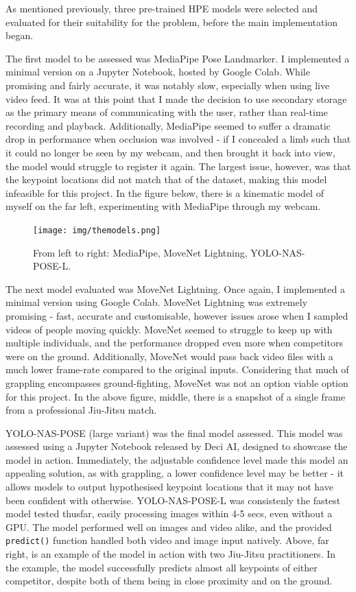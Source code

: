 \documentclass[a4paper, oneside, 11pt]{article}
\begin{document}
\noindent
As mentioned previously, three pre-trained HPE models were selected and evaluated for their suitability for the problem, before the main implementation began.

\bigskip
\noindent
The first model to be assessed was MediaPipe Pose Landmarker. I implemented a minimal version on a Jupyter Notebook, hosted by Google Colab. While promising and fairly accurate, it was notably slow, especially when using live video feed. It was at this point that I made the decision to use secondary storage as the primary means of communicating with the user, rather than real-time recording and playback. Additionally, MediaPipe seemed to suffer a dramatic drop in performance when occlusion was involved - if I concealed a limb such that it could no longer be seen by my webcam, and then brought it back into view, the model would struggle to register it again. The largest issue, however, was that the keypoint locations did not match that of the dataset, making this model infeasible for this project. In the figure below, there is a kinematic model of myself on the far left, experimenting with MediaPipe through my webcam.

\bigskip
\begin{figure}[ht]
    \centering
    \texttt{[image: img/themodels.png]}
    \caption{From left to right: MediaPipe, MoveNet Lightning, YOLO-NAS-POSE-L.}
    \label{fig:assessing-models}
\end{figure}

\bigskip
\noindent
The next model evaluated was MoveNet Lightning. Once again, I implemented a minimal version using Google Colab. MoveNet Lightning was extremely promising - fast, accurate and customisable, however issues arose when I sampled videos of people moving quickly. MoveNet seemed to struggle to keep up with multiple individuals, and the performance dropped even more when competitors were on the ground. Additionally, MoveNet would pass back video files with a much lower frame-rate compared to the original inputs. Considering that much of grappling encompasses ground-fighting, MoveNet was not an option viable option for this project. In the above figure, middle, there is a snapshot of a single frame from a professional Jiu-Jitsu match.

\bigskip
\noindent
YOLO-NAS-POSE (large variant) was the final model assessed. This model was assessed using a Jupyter Notebook released by Deci AI, designed to showcase the model in action. Immediately, the adjustable confidence level made this model an appealing solution, as with grappling, a lower confidence level may be better - it allows models to output hypothesised keypoint locations that it may not have been confident with otherwise. YOLO-NAS-POSE-L was consistenly the fastest model tested thusfar, easily processing images within 4-5 secs, even without a GPU. The model performed well on images and video alike, and the provided \texttt{predict()} function handled both video and image input natively. Above, far right, is an example of the model in action with two Jiu-Jitsu practitioners. In the example, the model successfully predicts almost all keypoints of either competitor, despite both of them being in close proximity and on the ground.
\end{document}
